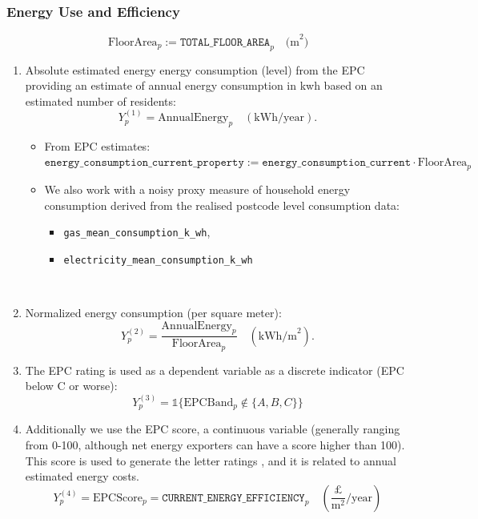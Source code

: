 \documentclass[12pt]{article}
\begin{document}
\subsubsection{Energy Use and Efficiency}
\[\text{FloorArea}_p:= \texttt{TOTAL\_FLOOR\_AREA}_p \quad \text{(m}^2\text{)} \]
\begin{enumerate}
    \item Absolute estimated energy energy consumption (level) from the EPC providing an estimate of annual energy consumption in kwh based on an estimated number of residents:
    \[
    Y^{(1)}_p = \text{AnnualEnergy}_p \quad (\text{kWh/year}).
    \]
    
    \begin{itemize}
        \item From EPC estimates: \\ \(\texttt{energy\_consumption\_current\_property}:= \texttt{energy\_consumption\_current}\cdot \text{FloorArea}_p\)
        \item We also work with a noisy proxy measure of household energy consumption derived from the realised postcode level consumption  data: \begin{itemize}
            \item \texttt{gas\_mean\_consumption\_k\_wh}, 
            \item \texttt{electricity\_mean\_consumption\_k\_wh}
        \end{itemize}\
        
    \end{itemize}

    \item Normalized energy consumption (per square meter):
    \[
    Y^{(2)}_p = \frac{\text{AnnualEnergy}_p}{\text{FloorArea}_p} \quad (\text{kWh/m}^2).
    \]

    \item The EPC rating is used as a dependent variable 
    as a discrete indicator (EPC below C or worse):
    \[
    Y^{(3)}_p =  \mathbb{1}\{\text{EPCBand}_p \not\in  \{A,B,C\} \}
    \]
    \item Additionally we use the EPC score, a continuous variable (generally ranging from 0-100, although net energy exporters can have a score higher than 100). This score is used to generate the letter ratings \autocite[p. 38]{BRE2025SAP10}, and it is related to annual estimated energy costs.     \[
    Y^{(4)}_p = \text{EPCScore}_p =  \texttt{CURRENT\_ENERGY\_EFFICIENCY}_p \quad (\frac{\text{£}}{\text{m}^2}/\text{year})
    \]

\end{enumerate}
\end{document}
